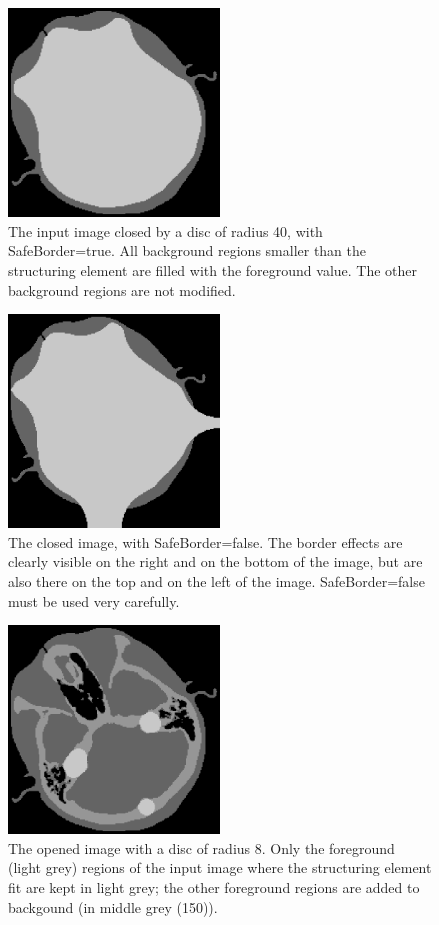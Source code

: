 \documentclass[IJ]{cesj}
\begin{document}
\begin{figure}
\centering
\includegraphics[width=0.5\textwidth]{close.eps}
\caption{The input image closed by a disc of radius 40, with SafeBorder=true. All background regions smaller than the structuring element are filled with the foreground value. The other background regions are not modified.}
\end{figure}

\begin{figure}
\centering
\includegraphics[width=0.5\textwidth]{close-unsafe.eps}
\caption{The closed image, with SafeBorder=false. The border effects are clearly visible on the right and on the bottom of the image, but are also there on the top and on the left of the image. SafeBorder=false must be used very carefully.}
\end{figure}

\begin{figure}
\centering
\includegraphics[width=0.5\textwidth]{open.eps}
\caption{The opened image with a disc of radius 8. Only the foreground (light grey) regions of the input image where the structuring element fit are kept in light grey; the other foreground regions are added to backgound (in middle grey (150)).}
\end{figure}
\end{document}
